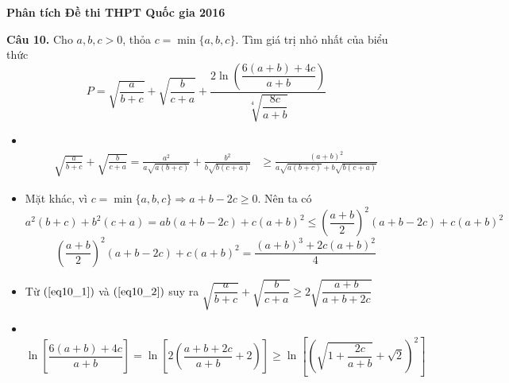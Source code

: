 \documentclass[handout]{beamer} %
\newcommand\FontviTen{\fontsize{8.5}{7.2}\selectfont}
\newcommand{\cau}[2]{\begin{block}{}
		{\color{red}\textbf{Câu #1.}} #2
	\end{block}
}
\begin{document}
		
		\begin{frame}{\textbf{\qquad Phân tích Đề thi THPT Quốc gia 2016}}~\\[-18pt]
			\FontviTen
			\cau{10}{Cho $a, b, c>0$, thỏa $c=\min\{a,b,c\}$. Tìm giá trị nhỏ nhất của biểu thức\\[-2pt]
				\begin{equation}\label{eq_pt10}
					P=\sqrt{\dfrac{a}{b+c}}+\sqrt{\dfrac{b}{c+a}}+\dfrac{2\ln\left( \dfrac{6(a+b)+4c}{a+b}\right)}{\sqrt[4]{\dfrac{8c}{a+b}}}
				\end{equation}}
				\begin{itemize}
					\item ~\\[-24pt]
					\begin{align}
						\sqrt{\frac{a}{b+c}}+\sqrt{\frac{b}{c+a}}=\frac{a^2}{a\sqrt{a(b+c)}} +\frac{b^2}{b\sqrt{b(c+a)}}&\geq \frac{(a+b)^2}{a\sqrt{a(b+c)}+ b\sqrt{b(c+a)}}\label{eq10_1}
					\end{align}
					\item Mặt khác, vì $c=\min \{a,b,c\}\Rightarrow a+b-2c\geq 0$. Nên ta có
					$$a^2(b+c)+b^2(c+a)=ab(a+b-2c)+c(a+b)^2\leq \left(\frac{a+b}{2}\right)^2(a+b-2c)+c(a+b)^2$$
					\begin{equation}\label{eq10_2}
						\left(\frac{a+b}{2}\right)^2(a+b-2c)+c(a+b)^2=\frac{(a+b)^3+2c(a+b)^2}{4}
					\end{equation}
					\item Từ $(\ref{eq10_1})$ và $(\ref{eq10_2})$ suy ra $\sqrt{\dfrac{a}{b+c}}+\sqrt{\dfrac{b}{c+a}}\geq 2\sqrt{\dfrac{a+b}{a+b+2c}}$\\[12pt]
					\item ~\\[-27pt]
					\begin{equation}\label{eq10_3}
						\ln\left[\frac{6(a+b)+4c}{a+b}\right]=\ln\left[2\left(\frac{a+b+2c}{a+b}+2\right)\right]\geq \ln\left[\left(\sqrt{1+\frac{2c}{a+b}}+\sqrt{2}\right)^2\right]
					\end{equation}
				\end{itemize}
			\end{frame}
			
\end{document}
